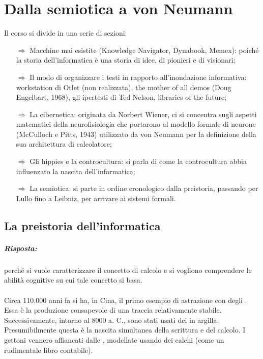 \chapter{Dalla semiotica a von Neumann}

Il corso si divide in una serie di sezioni:
\begin{itemize}
    \item [$\Rightarrow$] Macchine mai esistite (Knowledge
    Navigator, Dynabook, Memex): poiché la storia dell'informatica
    è una storia di idee, di pionieri e di visionari;
    \item [$\Rightarrow$] Il modo di organizzare i testi in rapporto all'inondazione 
    informativa: workstation di Otlet (non realizzata), the mother of all
    demos (Doug Engelbart, 1968), gli ipertesti di Ted Nelson, libraries
    of the future;
    \item [$\Rightarrow$] La cibernetica: originata da Norbert Wiener, ci si concentra sugli
    aspetti matematici della neurofisiologia che portarono al modello formale di
    neurone (McCulloch e Pitts, 1943) utilizzato da von Neumann per la
    definizione della sua architettura di calcolatore;
    \item [$\Rightarrow$] Gli hippies e la controcultura: si parla di come la controcultura 
    abbia influenzato la nascita dell'informatica;
    \item [$\Rightarrow$] La semiotica: si parte in ordine cronologico dalla preistoria, passando per Lullo fino
    a Leibniz, per arrivare ai sistemi formali.
\end{itemize}

\section{La preistoria dell'informatica}


\paragraph{Risposta:} perché si vuole caratterizzare il
concetto di calcolo e si vogliono comprendere le abilità cognitive
su cui tale concetto si basa.

\subsubsection{}

Circa 110.000 anni fa si ha, in Cina, il primo esempio di astrazione con degli . Essa è la produzione consapevole di una traccia relativamente stabile. Successivamente, intorno al 8000 a. C., sono stati usati dei  in argilla. Presumibilmente questa è la nascita simultanea della scrittura e del calcolo. I gettoni vennero affiancati dalle , modellate usando dei calchi (come un rudimentale libro contabile).

